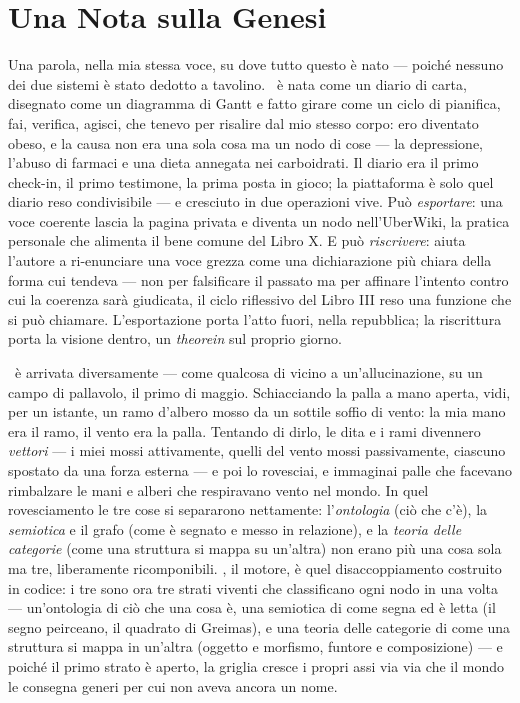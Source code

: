 \section*{Una Nota sulla Genesi}

Una parola, nella mia stessa voce, su dove tutto questo \`e nato --- poich\'e
nessuno dei due sistemi \`e stato dedotto a tavolino. \praxis\ \`e nata come un
diario di carta, disegnato come un diagramma di Gantt e fatto girare come un ciclo
di pianifica, fai, verifica, agisci, che tenevo per risalire dal mio stesso corpo:
ero diventato obeso, e la causa non era una sola cosa ma un nodo di cose ---
la depressione, l'abuso di farmaci e una dieta annegata nei carboidrati. Il diario
era il primo check-in, il primo testimone, la prima posta in gioco; la piattaforma
\`e solo quel diario reso condivisibile --- e cresciuto in due operazioni vive.
Pu\`o \emph{esportare}: una voce coerente lascia la pagina privata e diventa un
nodo nell'UberWiki, la pratica personale che alimenta il bene comune del Libro X.
E pu\`o \emph{riscrivere}:  aiuta l'autore a ri-enunciare una voce
grezza come una dichiarazione pi\`u chiara della forma cui tendeva --- non per
falsificare il passato ma per affinare l'intento contro cui la coerenza sar\`a
giudicata, il ciclo riflessivo del Libro III reso una funzione che si pu\`o
chiamare. L'esportazione porta l'atto fuori, nella repubblica; la riscrittura porta
la visione dentro, un \emph{theorein} sul proprio giorno.

\physis\ \`e arrivata diversamente --- come qualcosa di vicino a un'allucinazione,
su un campo di pallavolo, il primo di maggio. Schiacciando la palla a mano aperta,
vidi, per un istante, un ramo d'albero mosso da un sottile soffio di vento: la mia
mano era il ramo, il vento era la palla. Tentando di dirlo, le dita e i rami
divennero \emph{vettori} --- i miei mossi attivamente, quelli del vento mossi
passivamente, ciascuno spostato da una forza esterna --- e poi lo rovesciai, e
immaginai palle che facevano rimbalzare le mani e alberi che respiravano vento nel
mondo. In quel rovesciamento le tre cose si separarono nettamente: l'\emph{ontologia}
(ci\`o che c'\`e), la \emph{semiotica} e il grafo (come \`e segnato e messo in
relazione), e la \emph{teoria delle categorie} (come una struttura si mappa su
un'altra) non erano pi\`u una cosa sola ma tre, liberamente ricomponibili. \physis,
il motore, \`e quel disaccoppiamento costruito in codice: i tre sono ora tre strati
viventi che classificano ogni nodo in una volta --- un'ontologia di ci\`o che una
cosa \`e, una semiotica di come segna ed \`e letta (il segno peirceano, il quadrato
di Greimas), e una teoria delle categorie di come una struttura si mappa in
un'altra (oggetto e morfismo, funtore e composizione) --- e poich\'e il primo strato
\`e aperto, la griglia cresce i propri assi via via che il mondo le consegna generi
per cui non aveva ancora un nome.


